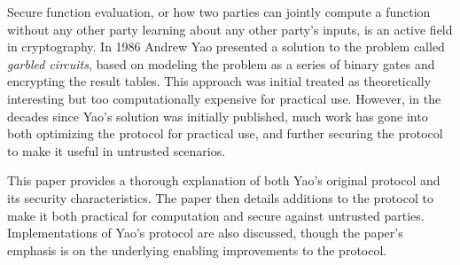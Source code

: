 Secure function evaluation, or how two parties can jointly compute a function without any other party learning about any other party's inputs, is an active field in cryptography. In 1986 Andrew Yao presented a solution to the problem called \emph{garbled circuits}, based on modeling the problem as a series of binary gates and encrypting the result tables. This approach was initial treated as theoretically interesting but too computationally expensive for practical use.  However, in the decades since Yao's solution was initially published, much work has gone into both optimizing the protocol for practical use, and further securing the protocol to make it useful in untrusted scenarios.

This paper provides a thorough explanation of both Yao's original protocol and its security characteristics.  The paper then details additions to the protocol to make it both practical for computation and secure against untrusted parties.  Implementations of Yao's protocol are also discussed, though the paper's emphasis is on the underlying enabling improvements to the protocol.
